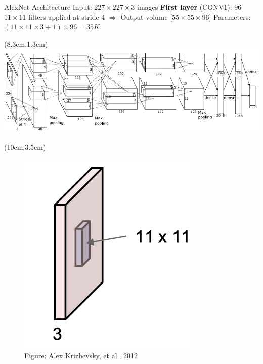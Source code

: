 \documentclass[serif, aspectratio=169]{beamer}
\begin{document}
\begin{frame}{AlexNet Architecture}
	\vspace{1cm}
	Input: $227 \times 227 \times 3$ images \vspace{0.3cm} \newline 
	\textbf{First layer} (CONV1): 96 $11 \times11$ filters applied at stride 4 \newline 
	$\Rightarrow$ Output volume [$55 \times 55 \times 96$] \newline
	Parameters: $(11 \times 11 \times 3 + 1) \times 96 = 35K$
	
	\begin{textblock*}{5cm}(8.3cm,1.3cm) %
		\includegraphics[keepaspectratio, scale=0.25]{pic/alexnet}
	\end{textblock*}
	
	\begin{textblock*}{6cm}(10cm,3.5cm) %
		\begin{figure}
			\includegraphics[keepaspectratio, scale=0.25]{pic/cnn_layer2}
			\caption*{\scriptsize{Figure: Alex Krizhevsky, et al., 2012}}
		\end{figure}
	\end{textblock*}
\end{frame}
\end{document}
